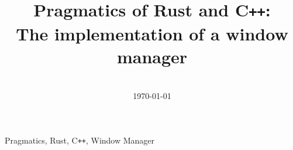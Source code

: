\documentclass[conference]{IEEEtran}
\begin{document}
\title{
  Pragmatics of Rust and C\texttt{++}:\\
  The implementation of a window manager\\
}

\author{
  \\
  \vspace*{20pt} \normalsize  \today{}\vspace*{-20pt}
}

\maketitle
\thispagestyle{footernumberstyle}



\begin{IEEEkeywords}
	Pragmatics, Rust, C\texttt{++}, Window Manager
\end{IEEEkeywords}











\end{document}
